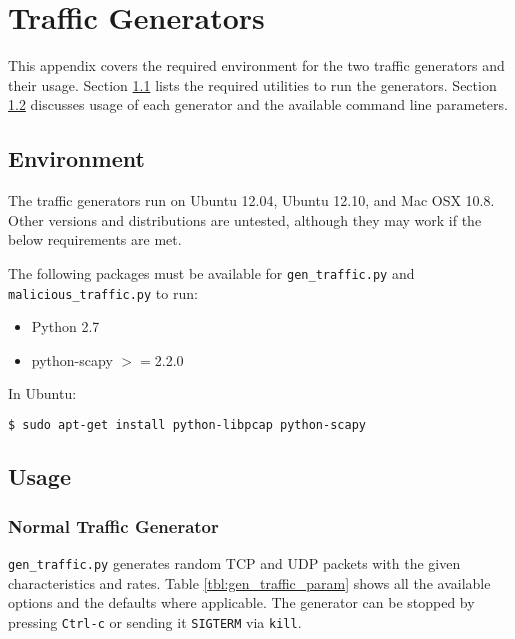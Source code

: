 \chapter{Traffic Generators}
\label{chp:generators}

\par This appendix covers the required environment for the two traffic generators and their usage. Section \ref{sec:gen_env} lists the required utilities to run the generators. Section \ref{sec:gen_usage} discusses usage of each generator and the available command line parameters.

\section{Environment}
\label{sec:gen_env}
\par The traffic generators run on Ubuntu 12.04, Ubuntu 12.10, and Mac OSX 10.8. Other versions and distributions are untested, although they may work if the below requirements are met. 

\par The following packages must be available for \texttt{gen\_traffic.py} and \texttt{malicious\_traffic.py} to run:
{\singlespace
\begin{itemize}
\item Python 2.7
\item python-scapy $>=$2.2.0
\end{itemize}
}

\par In Ubuntu:
\begin{lstlisting}[language=bash]
$ sudo apt-get install python-libpcap python-scapy
\end{lstlisting}

\section{Usage}
\label{sec:gen_usage}
\subsection{Normal Traffic Generator}
\par \texttt{gen\_traffic.py} generates random \ac{TCP} and \ac{UDP} packets with the given characteristics and rates. Table \ref{tbl:gen_traffic_param} shows all the available options and the defaults where applicable. The generator can be stopped by pressing \texttt{Ctrl-c} or sending it \texttt{SIGTERM} via \texttt{kill}.

